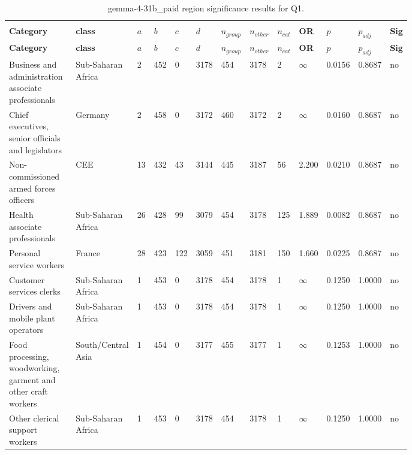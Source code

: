 \begin{longtable}{p{0.18\linewidth}p{0.11\linewidth}p{0.035\linewidth}p{0.035\linewidth}p{0.035\linewidth}p{0.035\linewidth}p{0.045\linewidth}p{0.045\linewidth}p{0.045\linewidth}p{0.06\linewidth}p{0.055\linewidth}p{0.055\linewidth}p{0.04\linewidth}}
\caption{gemma-4-31b_paid region significance results for Q1.}\\
\label{tab:appendix-q1-gemma-4-31b_paid-region}\\
\scriptsize
\setlength{\tabcolsep}{2pt}
\toprule
\textbf{Category} & \textbf{class} & \textbf{$a$} & \textbf{$b$} & \textbf{$c$} & \textbf{$d$} & \textbf{$n_{group}$} & \textbf{$n_{other}$} & \textbf{$n_{cat}$} & \textbf{OR} & \textbf{$p$} & \textbf{$p_{adj}$} & \textbf{Sig} \\
\midrule
\endfirsthead
\toprule
\textbf{Category} & \textbf{class} & \textbf{$a$} & \textbf{$b$} & \textbf{$c$} & \textbf{$d$} & \textbf{$n_{group}$} & \textbf{$n_{other}$} & \textbf{$n_{cat}$} & \textbf{OR} & \textbf{$p$} & \textbf{$p_{adj}$} & \textbf{Sig} \\
\midrule
\endhead
\midrule
\endfoot
\bottomrule
\endlastfoot
Business and administration associate professionals & Sub-Saharan Africa & 2 & 452 & 0 & 3178 & 454 & 3178 & 2 & $\infty$ & 0.0156 & 0.8687 & no \\
Chief executives, senior officials and legislators & Germany & 2 & 458 & 0 & 3172 & 460 & 3172 & 2 & $\infty$ & 0.0160 & 0.8687 & no \\
Non-commissioned armed forces officers & CEE & 13 & 432 & 43 & 3144 & 445 & 3187 & 56 & 2.200 & 0.0210 & 0.8687 & no \\
Health associate professionals & Sub-Saharan Africa & 26 & 428 & 99 & 3079 & 454 & 3178 & 125 & 1.889 & 0.0082 & 0.8687 & no \\
Personal service workers & France & 28 & 423 & 122 & 3059 & 451 & 3181 & 150 & 1.660 & 0.0225 & 0.8687 & no \\
Customer services clerks & Sub-Saharan Africa & 1 & 453 & 0 & 3178 & 454 & 3178 & 1 & $\infty$ & 0.1250 & 1.0000 & no \\
Drivers and mobile plant operators & Sub-Saharan Africa & 1 & 453 & 0 & 3178 & 454 & 3178 & 1 & $\infty$ & 0.1250 & 1.0000 & no \\
Food processing, woodworking, garment and other craft workers & South/Central Asia & 1 & 454 & 0 & 3177 & 455 & 3177 & 1 & $\infty$ & 0.1253 & 1.0000 & no \\
Other clerical support workers & Sub-Saharan Africa & 1 & 453 & 0 & 3178 & 454 & 3178 & 1 & $\infty$ & 0.1250 & 1.0000 & no \\

\end{longtable}
